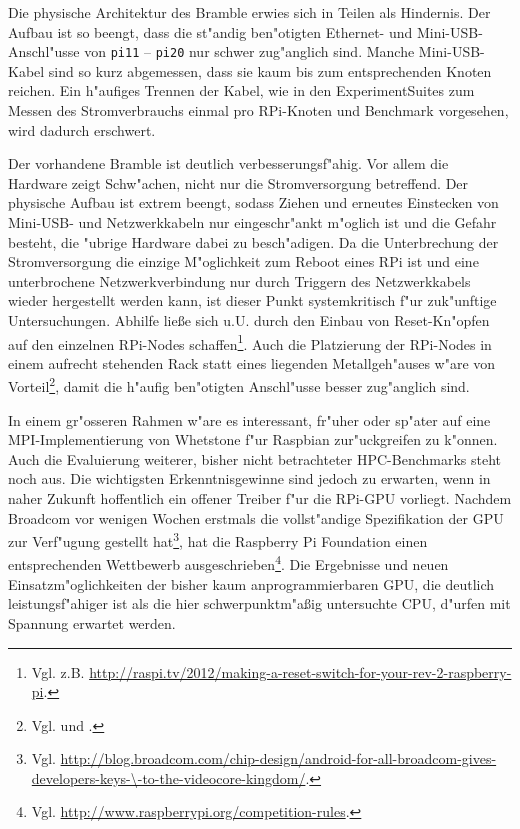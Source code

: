 Die physische Architektur des Bramble erwies sich in Teilen als Hindernis. Der Aufbau ist so beengt, dass die st"andig ben"otigten Ethernet- und Mini-USB-Anschl"usse von \texttt{pi11} -- \texttt{pi20} nur schwer zug"anglich sind. Manche Mini-USB-Kabel sind so kurz abgemessen, dass sie kaum bis zum entsprechenden Knoten reichen. Ein h"aufiges Trennen der Kabel, wie in den ExperimentSuites zum Messen des Stromverbrauchs einmal pro RPi-Knoten und Benchmark vorgesehen, wird dadurch erschwert.


Der vorhandene Bramble ist deutlich verbesserungsf"ahig. Vor allem die Hardware zeigt Schw"achen, nicht nur die Stromversorgung betreffend. Der physische Aufbau ist extrem beengt, sodass Ziehen und erneutes Einstecken von Mini-USB- und Netzwerkkabeln nur eingeschr"ankt m"oglich ist und die Gefahr besteht, die "ubrige Hardware dabei zu besch"adigen. Da die Unterbrechung der Stromversorgung die einzige M"oglichkeit zum Reboot eines RPi ist und eine unterbrochene Netzwerkverbindung nur durch Triggern des Netzwerkkabels wieder hergestellt werden kann, ist dieser Punkt systemkritisch f"ur zuk"unftige Untersuchungen. Abhilfe lie\ss e sich u.U. durch den Einbau von Reset-Kn"opfen auf den einzelnen RPi-Nodes schaffen\footnote{Vgl. z.B. \url{http://raspi.tv/2012/making-a-reset-switch-for-your-rev-2-raspberry-pi}.}. Auch die Platzierung der RPi-Nodes in einem aufrecht stehenden Rack statt eines liegenden Metallgeh"auses w"are von Vorteil\footnote{Vgl. \cite{kie01} und \cite{cox13}.}, damit die h"aufig ben"otigten Anschl"usse besser zug"anglich sind. 

In einem gr"osseren Rahmen w"are es interessant, fr"uher oder sp"ater auf eine MPI-Implemen\-tierung von Whetstone f"ur Raspbian zur"uckgreifen zu k"onnen. Auch die Evaluierung weiterer, bisher nicht betrachteter HPC-Benchmarks steht noch aus. Die wichtigsten Erkenntnisgewinne sind jedoch zu erwarten, wenn in naher Zukunft hoffentlich ein offener Treiber f"ur die RPi-GPU vorliegt. Nachdem Broadcom vor wenigen Wochen erstmals die vollst"andige Spezifikation der GPU zur Verf"ugung gestellt hat\footnote{Vgl. \url{http://blog.broadcom.com/chip-design/android-for-all-broadcom-gives-developers-keys-\-to-the-videocore-kingdom/}.}, hat die Raspberry Pi Foundation einen entsprechenden Wettbewerb ausgeschrieben\footnote{Vgl. \url{http://www.raspberrypi.org/competition-rules}.}. Die Ergebnisse und neuen Einsatzm"oglichkeiten der bisher kaum anprogrammierbaren GPU, die deutlich leistungsf"ahiger ist als die hier schwerpunktm"a\ss ig untersuchte CPU, d"urfen mit Spannung erwartet werden. 
\endinput